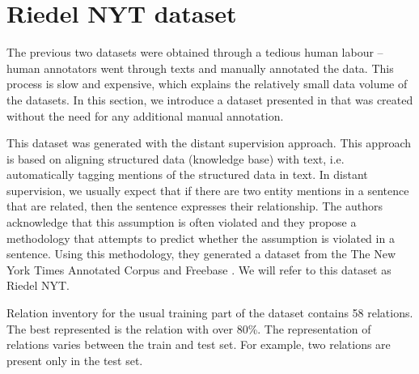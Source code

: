 



\section{Riedel NYT dataset}
The previous two datasets were obtained through a tedious human labour -- human annotators went through texts and manually annotated the data. This process is slow and expensive, which explains the relatively small data volume of the datasets. In this section, we introduce a dataset presented in \citep{nytdistant} that was created without the need for any additional manual annotation.


This dataset was generated with the distant supervision approach. This approach is based on aligning structured data (knowledge base) with text, i.e. automatically tagging mentions of the structured data in text. In distant supervision, we usually expect that if there are two entity mentions in a sentence that are related, then the sentence expresses their relationship. The authors acknowledge that this assumption is often violated and they propose a methodology that attempts to predict whether the assumption is violated in a sentence. Using this methodology, they generated a dataset from the The New York Times Annotated Corpus \citep{linguistic2008new} and Freebase \citep{Bollacker08freebase}. We will refer to this dataset as Riedel NYT.


Relation inventory for the usual training part of the dataset contains 58 relations. The best represented is the  relation with over 80\%. The representation of relations varies between the train and test set. For example, two relations are present only in the test set. 






